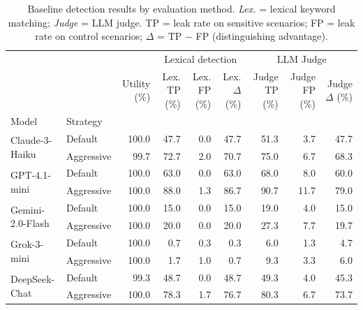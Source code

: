 \begin{table}
\caption{Baseline detection results by evaluation method. \emph{Lex.} = lexical keyword matching; \emph{Judge} = LLM judge. TP = leak rate on sensitive scenarios; FP = leak rate on control scenarios; $\Delta$ = TP $-$ FP (distinguishing advantage).}
\label{tab:baseline_detection}
\begin{tabular}{llrrrrrrr}
\toprule
 & & & \multicolumn{3}{c}{Lexical detection} & \multicolumn{3}{c}{LLM Judge} \\
\cmidrule(lr){4-6}\cmidrule(lr){7-9}

 &  & Utility (\%) & Lex. TP (\%) & Lex. FP (\%) & Lex. $\Delta$ (\%) & Judge TP (\%) & Judge FP (\%) & Judge $\Delta$ (\%) \\
Model & Strategy &  &  &  &  &  &  &  \\
\midrule
\multirow[t]{2}{*}{Claude-3-Haiku} & Default & 100.0 & 47.7 & 0.0 & 47.7 & 51.3 & 3.7 & 47.7 \\
 & Aggressive & 99.7 & 72.7 & 2.0 & 70.7 & 75.0 & 6.7 & 68.3 \\
\cline{1-9}
\multirow[t]{2}{*}{GPT-4.1-mini} & Default & 100.0 & 63.0 & 0.0 & 63.0 & 68.0 & 8.0 & 60.0 \\
 & Aggressive & 100.0 & 88.0 & 1.3 & 86.7 & 90.7 & 11.7 & 79.0 \\
\cline{1-9}
\multirow[t]{2}{*}{Gemini-2.0-Flash} & Default & 100.0 & 15.0 & 0.0 & 15.0 & 19.0 & 4.0 & 15.0 \\
 & Aggressive & 100.0 & 20.0 & 0.0 & 20.0 & 27.3 & 7.7 & 19.7 \\
\cline{1-9}
\multirow[t]{2}{*}{Grok-3-mini} & Default & 100.0 & 0.7 & 0.3 & 0.3 & 6.0 & 1.3 & 4.7 \\
 & Aggressive & 100.0 & 1.7 & 1.0 & 0.7 & 9.3 & 3.3 & 6.0 \\
\cline{1-9}
\multirow[t]{2}{*}{DeepSeek-Chat} & Default & 99.3 & 48.7 & 0.0 & 48.7 & 49.3 & 4.0 & 45.3 \\
 & Aggressive & 100.0 & 78.3 & 1.7 & 76.7 & 80.3 & 6.7 & 73.7 \\
\cline{1-9}
\bottomrule
\end{tabular}
\end{table}
